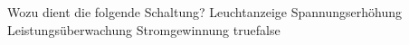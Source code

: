     {Wozu dient die folgende Schaltung?}
    {Leuchtanzeige}
    {Spannungserhöhung}
    {Leistungsüberwachung}
    {Stromgewinnung}
    {true}{false}